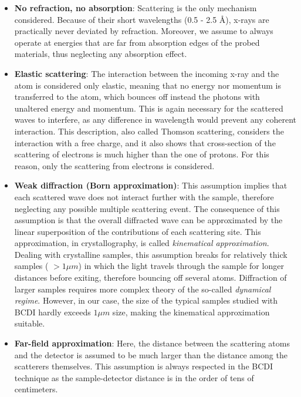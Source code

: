 \begin{itemize}
    \item \textbf{No refraction, no absorption}: Scattering is the only mechanism considered. Because of their short wavelengths
    (0.5 - 2.5 \AA), x-rays are practically never deviated by refraction. Moreover, we assume to always operate at energies that 
    are far from absorption edges of the probed materials, thus neglecting any absorption effect. 
    \item \textbf{Elastic scattering}: The interaction between the incoming x-ray and the atom is considered only elastic, meaning that 
    no energy nor momentum is transferred to the atom, which bounces off instead the photons with unaltered energy and 
    momentum. This is again necessary for the scattered waves to interfere, as any difference in wavelength would 
    prevent any coherent interaction. This description, also called Thomson scattering, considers the interaction with a free charge, 
    and it also shows that cross-section of the scattering of electrons is much higher than the one of protons. 
    For this reason, only the scattering from electrons is considered. 
    \item \textbf{Weak diffraction (Born approximation)}: This assumption implies that each scattered wave does not interact 
    further with the sample, therefore neglecting any possible multiple scattering event. The consequence of this assumption 
    is that the overall diffracted wave can be approximated by the linear superposition of the contributions of each scattering site. 
    This approximation, in crystallography, is called \textit{kinematical approximation}. 
    Dealing with crystalline samples, this assumption breaks for relatively thick samples ( $ > 1 \mu m $) in which the 
    light travels through the sample for longer distances before exiting, therefore bouncing off several atoms. 
    Diffraction of larger samples requires more complex theory of the so-called \textit{dynamical regime}.
    However, in our case, the size of the typical samples studied with BCDI hardly exceeds $ 1 \mu m $ size, making the 
    kinematical approximation suitable. 
    \item \textbf{Far-field approximation}: Here, the distance between the scattering atoms and the detector is assumed 
    to be much larger than the distance among the scatterers themselves. This assumption is always respected in the BCDI 
    technique as the sample-detector distance is in the order of tens of centimeters.

\end{itemize}

